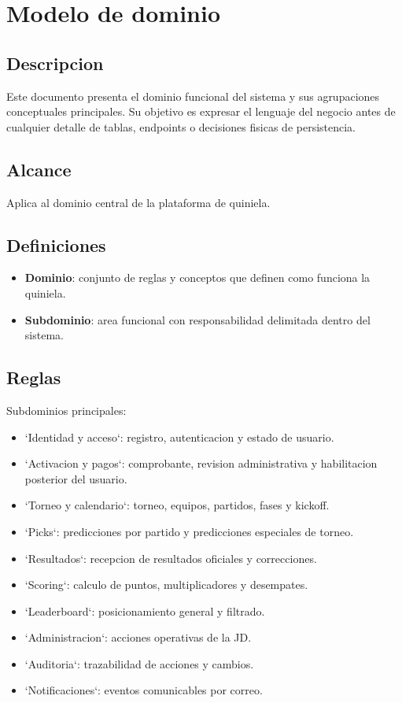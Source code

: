 \section{Modelo de dominio}

\subsection{Descripcion}

Este documento presenta el dominio funcional del sistema y sus agrupaciones conceptuales principales. Su objetivo es expresar el lenguaje del negocio antes de cualquier detalle de tablas, endpoints o decisiones fisicas de persistencia.

\subsection{Alcance}

Aplica al dominio central de la plataforma de quiniela.

\subsection{Definiciones}

\begin{itemize}
  \item \textbf{Dominio}: conjunto de reglas y conceptos que definen como funciona la quiniela.
  \item \textbf{Subdominio}: area funcional con responsabilidad delimitada dentro del sistema.
\end{itemize}

\subsection{Reglas}

Subdominios principales:

\begin{itemize}
  \item `Identidad y acceso`: registro, autenticacion y estado de usuario.
  \item `Activacion y pagos`: comprobante, revision administrativa y habilitacion posterior del usuario.
  \item `Torneo y calendario`: torneo, equipos, partidos, fases y kickoff.
  \item `Picks`: predicciones por partido y predicciones especiales de torneo.
  \item `Resultados`: recepcion de resultados oficiales y correcciones.
  \item `Scoring`: calculo de puntos, multiplicadores y desempates.
  \item `Leaderboard`: posicionamiento general y filtrado.
  \item `Administracion`: acciones operativas de la JD.
  \item `Auditoria`: trazabilidad de acciones y cambios.
  \item `Notificaciones`: eventos comunicables por correo.
\end{itemize}

